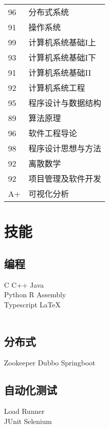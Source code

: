 \documentclass[]{deedy-resume-openfont}
\begin{document}
{\begin{minipage}[t]{0.25\textwidth}
\begin{tabular}{ll}
96  & 分布式系统 \\
91  & 操作系统 \\
99  & 计算机系统基础I上 \\
93  & 计算机系统基础I下 \\
91  & 计算机系统基础II \\
92  & 计算机系统工程 \\
95  & 程序设计与数据结构 \\
89  & 算法原理 \\
96  & 软件工程导论 \\
98  & 程序设计思想与方法 \\
92  & 离散数学 \\
92  & 项目管理及软件开发 \\
A+  & 可视化分析 \\
\end{tabular}
\sectionsep


\section{技能}
\sectionsep
\subsection{编程}
C  \textbullet{} C++ \textbullet{} Java \\
Python \textbullet{}R \textbullet{} Assembly \\
Typescript  \textbullet{} \LaTeX\\\ 

\sectionsep
\subsection{分布式}
Zookeeper \textbullet{} Dubbo \textbullet{} Springboot\\
\sectionsep

\sectionsep
\subsection{自动化测试}
Load Runner \\
JUnit \textbullet{} Selenium\\
\sectionsep
%
%


\end{minipage}}
\end{document}
